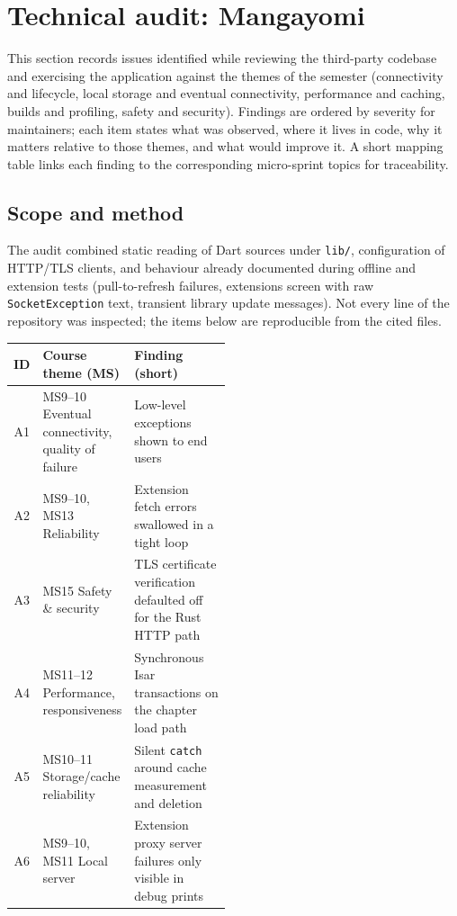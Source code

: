 \section{Technical audit: Mangayomi}
\label{sec:technical-audit}

This section records issues identified while reviewing the third-party codebase and exercising the application against the themes of the semester (connectivity and lifecycle, local storage and eventual connectivity, performance and caching, builds and profiling, safety and security). Findings are ordered by severity for maintainers; each item states what was observed, where it lives in code, why it matters relative to those themes, and what would improve it. A short mapping table links each finding to the corresponding micro-sprint topics for traceability.

\subsection*{Scope and method}
The audit combined static reading of Dart sources under \texttt{lib/}, configuration of HTTP/TLS clients, and behaviour already documented during offline and extension tests (pull-to-refresh failures, extensions screen with raw \texttt{SocketException} text, transient library update messages). Not every line of the repository was inspected; the items below are reproducible from the cited files.

\begin{center}
\begin{tabular}{@{}clp{0.48\linewidth}@{}}
\hline
\textbf{ID} & \textbf{Course theme (MS)} & \textbf{Finding (short)} \\
\hline
A1 & MS9--10 Eventual connectivity, quality of failure & Low-level exceptions shown to end users \\
\hline
A2 & MS9--10, MS13 Reliability & Extension fetch errors swallowed in a tight loop \\
\hline
A3 & MS15 Safety \& security & TLS certificate verification defaulted off for the Rust HTTP path \\
\hline
A4 & MS11--12 Performance, responsiveness & Synchronous Isar transactions on the chapter load path \\
\hline
A5 & MS10--11 Storage/cache reliability & Silent \texttt{catch} around cache measurement and deletion \\
\hline
A6 & MS9--10, MS11 Local server & Extension proxy server failures only visible in debug prints \\
\hline
\end{tabular}
\end{center}


